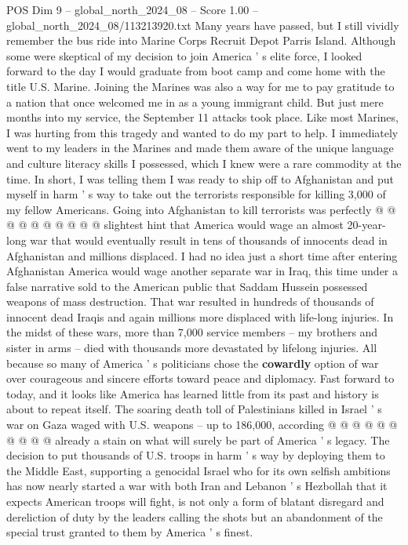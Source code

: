 \begin{textsample}{POS Dim 9 – global\_north\_2024\_08 – Score 1.00 – global\_north\_2024\_08/113213920.txt}  \label{ex:f9_pos_195}
Many years have passed, but I still vividly remember the bus ride into Marine Corps Recruit Depot Parris Island.
Although some were skeptical of my decision to join America ' s elite force, I looked forward to the day I would graduate from boot camp and come home with the title U.S.
Marine.
Joining the Marines was also a way for me to pay gratitude to a nation that once welcomed me in as a young immigrant child.
But just mere months into my service, the September 11 attacks took place.
Like most Marines, I was hurting from this tragedy and wanted to do my part to help.
I immediately went to my leaders in the Marines and made them aware of the unique language and culture literacy skills I possessed, which I knew were a rare commodity at the time.
In short, I was telling them I was ready to ship off to Afghanistan and put myself in harm ' s way to take out the terrorists responsible for killing 3,000 of my fellow Americans.
Going into Afghanistan to kill terrorists was perfectly @ @ @ @ @ @ @ @ @ @ slightest hint that America would wage an almost 20-year-long war that would eventually result in tens of thousands of innocents dead in Afghanistan and millions displaced.
I had no idea just a short time after entering Afghanistan America would wage another separate war in Iraq, this time under a false narrative sold to the American public that Saddam Hussein possessed weapons of mass destruction.
That war resulted in hundreds of thousands of innocent dead Iraqis and again millions more displaced with life-long injuries.
In the midst of these wars, more than 7,000 service members -- my brothers and sister in arms -- died with thousands more devastated by lifelong injuries.
All because so many of America ' s politicians chose the \textbf{cowardly} option of war over courageous and sincere efforts toward peace and diplomacy.
Fast forward to today, and it looks like America has learned little from its past and history is about to repeat itself.
The soaring death toll of Palestinians killed in Israel ' s war on Gaza waged with U.S. weapons -- up to 186,000, according @ @ @ @ @ @ @ @ @ @ already a stain on what will surely be part of America ' s legacy.
The decision to put thousands of U.S. troops in harm ' s way by deploying them to the Middle East, supporting a genocidal Israel who for its own selfish ambitions has now nearly started a war with both Iran and Lebanon ' s Hezbollah that it expects American troops will fight, is not only a form of blatant disregard and dereliction of duty by the leaders calling the shots but an abandonment of the special trust granted to them by America ' s finest.

\end{textsample}
